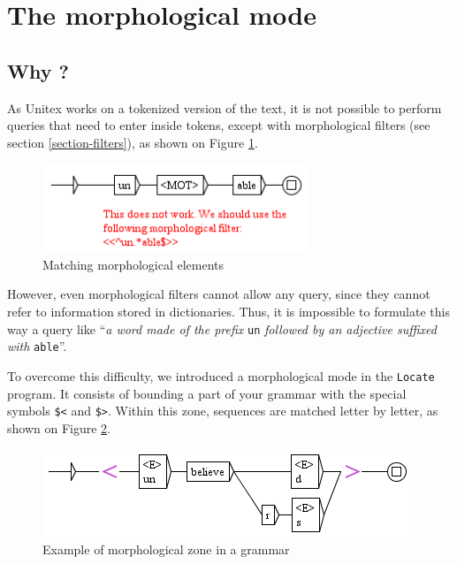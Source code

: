 \clearpage

\section{The morphological mode}
\label{section-morphological-mode}
\subsection{Why ?}
As Unitex works on a tokenized version of the text, it is not possible to
perform queries that need to enter inside tokens, except with morphological
filters (see section \ref{section-filters}), as shown on Figure
\ref{fig-morpho1}.

\begin{figure}[!ht]
\begin{center}
\includegraphics[width=8cm]{resources/img/fig6-17k.png}
\caption{Matching morphological elements\label{fig-morpho1}}
\end{center}
\end{figure}

\bigskip
\noindent However, even morphological filters cannot allow any query, since they
cannot refer to information stored in dictionaries. Thus, it is impossible to formulate this way a
query like ``\textit{a word made of the prefix} \verb$un$ \textit{followed by an
adjective suffixed with} \verb+able+''.

\bigskip
\noindent To overcome this difficulty, we introduced a morphological mode in
the \verb$Locate$ program. It consists of bounding a part of your grammar with
the special symbols \verb+$<+ and \verb+$>+.\index{\verb+$<+}\index{\verb+$>+}
Within this zone, sequences are matched letter by letter, as shown on Figure
\ref{fig-morpho2}.

\begin{figure}[!ht]
\begin{center}
\includegraphics[width=11cm]{resources/img/fig6-17l.png}
\caption{Example of morphological zone in a grammar\label{fig-morpho2}}
\end{center}
\end{figure}

